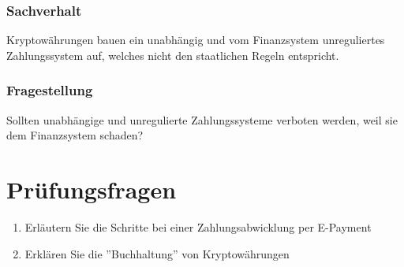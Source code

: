 \subsubsection{Sachverhalt}
Kryptowährungen bauen ein unabhängig und vom Finanzsystem unreguliertes Zahlungssystem auf, welches nicht den staatlichen Regeln entspricht. 

\subsubsection{Fragestellung}
Sollten unabhängige und unregulierte Zahlungssysteme verboten werden, weil sie dem Finanzsystem schaden?

\section{Prüfungsfragen}

\begin{enumerate}
	\item Erläutern Sie die Schritte bei einer Zahlungsabwicklung per E-Payment
	\item Erklären Sie die ''Buchhaltung'' von Kryptowährungen
\end{enumerate}

